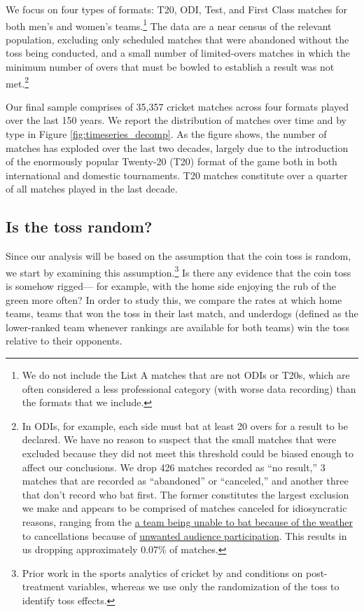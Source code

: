 \documentclass[11pt,  letterpaper]{article}
\begin{document}
We focus on four types of formats: T20, ODI, Test, and First Class matches for both men's and women's teams.\footnote{We do not include the List A matches that are not ODIs or T20s, which are often considered a less professional category (with worse data recording) than the formats that we include.} The data are a near census of the relevant population, excluding only scheduled matches that were abandoned without the toss being conducted, and a small number of limited-overs matches in which the minimum number of overs that must be bowled to establish a result was not met.\footnote{In ODIs, for example, each side must bat at least 20 overs for a result to be declared. We have no reason to suspect that the small matches that were excluded because they did not meet this threshold could be biased enough to affect our conclusions. We drop 426 matches recorded as ``no result,'' 3 matches that are recorded as ``abandoned'' or ``canceled,'' and another three that don't record who bat first. The former constitutes the largest exclusion we make and appears to be comprised of matches canceled for idiosyncratic reasons, ranging from the \href{https://www.espncricinfo.com/series/shell-tri-series-1991-92-61203/australia-women-vs-england-women-final-66975/full-scorecard}{a team being unable to bat because of the weather} to cancellations because of \href{https://www.espncricinfo.com/series/australia-tour-of-pakistan-1982-83-61392/pakistan-vs-australia-3rd-odi-64196/full-scorecard}{unwanted audience participation}. This results in us dropping approximately 0.07\% of matches.}

Our final sample comprises of 35,357 cricket matches across four formats played over the last 150 years. We report the distribution of matches over time and by type in Figure \ref{fig:timeseries_decomp}. As the figure shows, the number of matches has exploded over the last two decades, largely due to the introduction of the enormously popular Twenty-20 (T20) format of the game both in both international and domestic tournaments. T20 matches constitute over a quarter of all matches played in the last decade.


\subsection{Is the toss random?}

Since our analysis will be based on the assumption that the coin toss is random, we start by examining this assumption.\footnote{Prior work in the sports analytics of cricket by \citet{shafqat2015analysis} and \citet{dawson2009bat} conditions on post-treatment variables, whereas we use only the randomization of the toss to identify toss effects.} Is there any evidence that the coin toss is somehow rigged--- for example, with the home side enjoying the rub of the green more often? In order to study this, we compare the rates at which home teams, teams that won the toss in their last match, and underdogs (defined as the lower-ranked team whenever rankings are available for both teams) win the toss relative to their opponents. 
\end{document}
